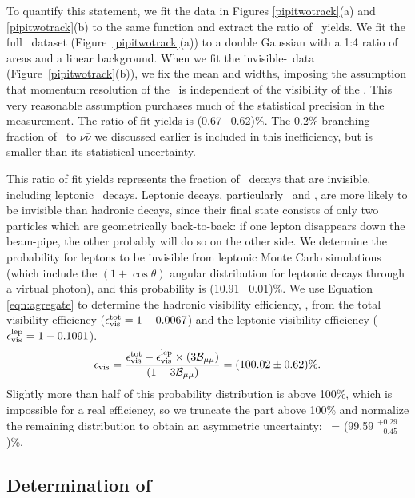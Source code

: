 \documentclass{cornell}
\begin{document}
To quantify this statement, we fit the data in Figures
\ref{pipitwotrack}(a) and \ref{pipitwotrack}(b) to the same function and
extract the ratio of \twotoone\ yields.  We fit the full \twotrack\
dataset (Figure~\ref{pipitwotrack}(a)) to a double Gaussian with a 1:4
ratio of areas and a linear background.  When we fit the
invisible-\us\ data (Figure~\ref{pipitwotrack}(b)), we fix the mean and
widths, imposing the assumption that momentum resolution of the \pipi\
is independent of the visibility of the \us.  This very reasonable
assumption purchases much of the statistical precision in the
measurement.  The ratio of fit yields is (0.67 \PM\ 0.62)\%.  The
0.2\% branching fraction of \us\ to $\nu\bar{\nu}$ we discussed
earlier is included in this inefficiency, but is smaller than its
statistical uncertainty.

This ratio of fit yields represents the fraction of \us\ decays that
are invisible, including leptonic \us\ decays.  Leptonic decays,
particularly \ee\ and \mumu, are more likely to be invisible than
hadronic decays, since their final state consists of only two
particles which are geometrically back-to-back: if one lepton
disappears down the beam-pipe, the other probably will do so on
the other side.  We determine the probability for leptons to be
invisible from leptonic Monte Carlo simulations (which include the
$(1+\cos\theta)$ angular distribution for leptonic decays through a
virtual photon), and this probability is (10.91 \PM\ 0.01)\%.  We use
Equation \ref{eqn:agregate} to determine the hadronic visibility
efficiency, \evis, from the total visibility efficiency
($\epsilon_{\mbox{\scriptsize vis}}^{\mbox{\scriptsize tot}} = 1 - 0.0067$) and the leptonic
visibility efficiency ($\epsilon_{\mbox{\scriptsize vis}}^{\mbox{\scriptsize lep}} = 1 - 0.1091$).
\begin{equation}
  \epsilon_{\mbox{\scriptsize vis}} = \frac{\epsilon_{\mbox{\scriptsize vis}}^{\mbox{\scriptsize tot}} - \epsilon_{\mbox{\scriptsize vis}}^{\mbox{\scriptsize lep}} \times (3{\mathcal B}_{\mu\mu})}{(1 - 3{\mathcal B}_{\mu\mu})}
  = (100.02 \pm 0.62)\% \mbox{.}
  \label{eqn:leptoniccorrection}
\end{equation}
Slightly more than half of this probability distribution is above
100\%, which is impossible for a real efficiency, so we truncate the
part above 100\% and normalize the remaining distribution to obtain an
asymmetric uncertainty: \evis\ = (99.59 $^{+0.29}_{-0.45}$)\%.

\subsection{Determination of \boldmath \ecuts}
\end{document}
